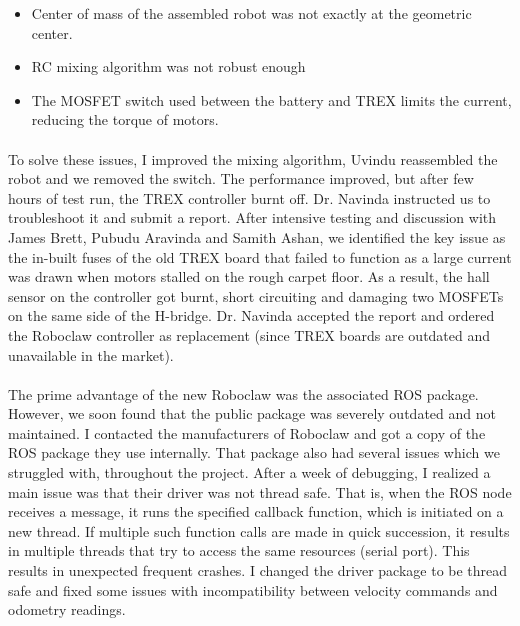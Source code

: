 \begin{itemize}
    \item Center of mass of the assembled robot was not exactly at the geometric center.
    \item RC mixing algorithm was not robust enough
    \item The MOSFET switch used between the battery and TREX limits the current, reducing the torque of motors.
\end{itemize} 

\paragraph{}
To solve these issues, I improved the mixing algorithm, Uvindu reassembled the robot and we removed the switch. The performance improved, but after few hours of test run, the TREX controller burnt off. Dr. Navinda instructed us to troubleshoot it and submit a report. After intensive testing and discussion with James Brett, Pubudu Aravinda and Samith Ashan, we identified the key issue as the in-built fuses of the old TREX board that failed to function as a large current was drawn when motors stalled on the rough carpet floor. As a result, the hall sensor on the controller got burnt, short circuiting and damaging two MOSFETs on the same side of the H-bridge. Dr. Navinda accepted the report and ordered the Roboclaw controller as replacement (since TREX boards are outdated and unavailable in the market). 

\paragraph{}
The prime advantage of the new Roboclaw was the associated ROS package. However, we soon found that the public package was severely outdated and not maintained. I contacted the manufacturers of Roboclaw and got a copy of the ROS package they use internally. That package also had several issues which we struggled with, throughout the project. After a week of debugging, I realized a main issue was that their driver was not thread safe. That is, when the ROS node receives a message, it runs the specified callback function, which is initiated on a new thread. If multiple such function calls are made in quick succession, it results in multiple threads that try to access the same resources (serial port). This results in unexpected frequent crashes. I changed the driver package to be thread safe and fixed some issues with incompatibility between velocity commands and odometry readings.

